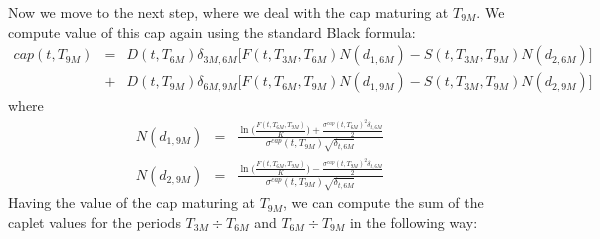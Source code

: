 \documentclass[11pt]{article}
\numberwithin{equation}{subsection}
\begin{document}
Now we move to the next step, where we deal with the cap maturing at \(T_{9M}\). We compute value of this cap again using the standard Black formula:
\begin{eqnarray*}
	cap(t, T_{9M}) &=& D(t, T_{6M}) \delta_{3M,6M} \big[ F(t, T_{3M}, T_{6M}) N(d_{1,6M})- S(t, T_{3M}, T_{9M})N(d_{2,6M})\big]   \\
	&+& D(t, T_{9M}) \delta_{6M,9M} \big[F(t, T_{6M}, T_{9M}) N(d_{1,9M}) - S(t, T_{3M}, T_{9M})N(d_{2,9M}) \big]
\end{eqnarray*}
where 
\begin{eqnarray*}
	N(d_{1,9M})&=&\frac{\ln\Big(\frac{F(t, T_{6M}, T_{9M})}{K}\Big) + \frac{\sigma^{cap}(t, T_{6M})^2\delta_{t, 6M}}{2}}{\sigma^{cap}(t, T_{9M})\sqrt{\delta_{t,6M}}}
\end{eqnarray*}
\begin{eqnarray*}
	N(d_{2,9M})&=&\frac{\ln\Big(\frac{F(t, T_{6M}, T_{9M})}{K}\Big) - \frac{\sigma^{cap}(t, T_{9M})^2\delta_{t, 6M}}{2}}{\sigma^{cap}(t, T_{9M})\sqrt{\delta_{t,6M}}}
\end{eqnarray*}
Having the value of the cap maturing at \(T_{9M}\), we can compute the sum of the caplet values
for the periods \(T_{3M} \div T_{6M}\) and \(T_{6M} \div T_{9M}\) in the following way:
\end{document}
